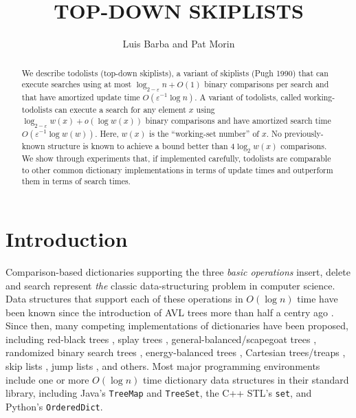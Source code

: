 \documentclass[12pt]{patmorin}
\title{\MakeUppercase{Top-Down Skiplists}}
\author{Luis Barba and Pat Morin}
\newcommand{\eps}{\varepsilon}
\begin{document}
\begin{titlepage}
\maketitle

\begin{abstract}
  We describe todolists (top-down skiplists), a variant of skiplists
  (Pugh 1990) that can execute searches using at most $\log_{2-\eps} n +
  O(1)$ binary comparisons per search and that have amortized update time
  $O(\eps^{-1}\log n)$. A variant of todolists, called working-todolists
  can execute a search for any element $x$ using $\log_{2-\eps} w(x)
  + o(\log w(x))$ binary comparisons and have amortized search time
  $O(\eps^{-1}\log w(w))$. Here, $w(x)$ is the ``working-set number'' of
  $x$. No previously-known structure is known to achieve a bound better
  than $4\log_2 w(x)$ comparisons. We show through experiments that,
  if implemented carefully, todolists are comparable to other common
  dictionary implementations in terms of update times and outperform
  them in terms of search times.
\end{abstract}

\end{titlepage}

\section{Introduction}

Comparison-based dictionaries supporting the three \emph{basic
operations} insert, delete and search represent \emph{the} classic
data-structuring problem in computer science.  Data structures that
support each of these operations in $O(\log n)$ time have been known
since the introduction of AVL trees more than half a centry ago
\cite{adelson-velskii.landis:algorithm}.  Since then, many competing
implementations of dictionaries have been proposed, including
red-black trees \cite{guibas.sedgewick:dichromatic}, splay trees
\cite{sleator.tarjan:self-adjusting}, general-balanced/scapegoat
trees \cite{andersson:general,galperin.rivest:scapegoat},
randomized binary search trees \cite{martinez:randomized},
energy-balanced trees \cite{goodrich:competitive}, Cartesian trees/treaps
\cite{aragon.seidel:randomized,vuillemin:unifying}, skip lists
\cite{pugh:skip}, jump lists \cite{bronnimann.cazals.ea:randomized},
and others.  Most major programming environments include one or more
$O(\log n)$ time dictionary data structures in their standard library,
including Java's \texttt{TreeMap} and \texttt{TreeSet}, the C++ STL's
\texttt{set}, and Python's \texttt{OrderedDict}.
\end{document}
